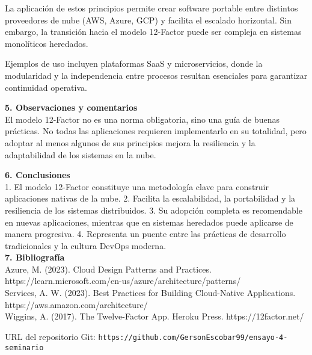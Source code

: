 \documentclass[12pt]{article}
\begin{document}
La aplicación de estos principios permite crear software portable entre distintos proveedores de nube (AWS, Azure, GCP) y facilita el escalado horizontal. Sin embargo, la transición hacia el modelo 12-Factor puede ser compleja en sistemas monolíticos heredados.

Ejemplos de uso incluyen plataformas SaaS y microservicios, donde la modularidad y la independencia entre procesos resultan esenciales para garantizar continuidad operativa.

\textbf{5. Observaciones y comentarios}  
\\
El modelo 12-Factor no es una norma obligatoria, sino una guía de buenas prácticas. No todas las aplicaciones requieren implementarlo en su totalidad, pero adoptar al menos algunos de sus principios mejora la resiliencia y la adaptabilidad de los sistemas en la nube.

\textbf{6. Conclusiones}  
\\
1. El modelo 12-Factor constituye una metodología clave para construir aplicaciones nativas de la nube.  
2. Facilita la escalabilidad, la portabilidad y la resiliencia de los sistemas distribuidos.  
3. Su adopción completa es recomendable en nuevas aplicaciones, mientras que en sistemas heredados puede aplicarse de manera progresiva.  
4. Representa un puente entre las prácticas de desarrollo tradicionales y la cultura DevOps moderna. 
\\
\textbf{7. Bibliografía}  
\\
Azure, M. (2023). Cloud Design Patterns and Practices. https://learn.microsoft.com/en-us/azure/architecture/patterns/
\\
Services, A. W. (2023). Best Practices for Building Cloud-Native Applications. https://aws.amazon.com/architecture/
\\
Wiggins, A. (2017). The Twelve-Factor App. Heroku Press. https://12factor.net/
\printbibliography

\vspace{0.5cm}
\noindent URL del repositorio Git: \texttt{https://github.com/GersonEscobar99/ensayo-4-seminario}
\end{document}

